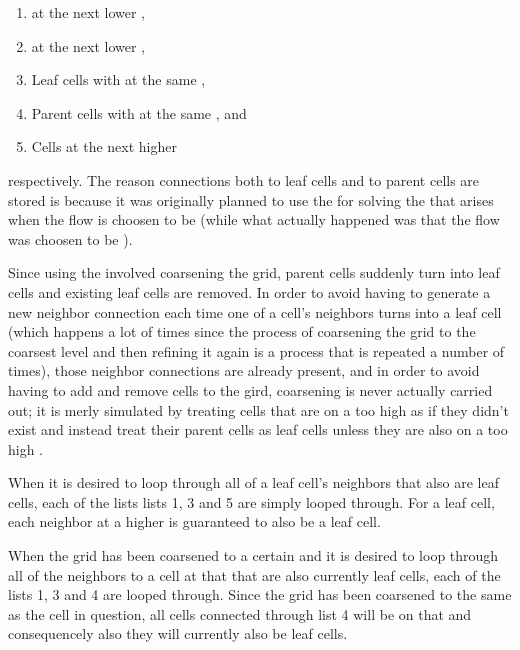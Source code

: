 \begin{enumerate}
    \item {} at the next lower \LOD,
    \item {} at the next lower \LOD,
    \item Leaf cells with at the same \LOD,
    \item Parent cells with at the same \LOD, and
    \item Cells at the next higher \LOD
\end{enumerate}

respectively. The reason connections both to leaf cells and to parent cells are stored is because it was originally planned to use the  for solving the  that arises when the flow is choosen to be  (while what actually happened was that the flow was choosen to be ).

Since using the  involved coarsening the grid, parent cells suddenly turn into leaf cells and existing leaf cells are removed. In order to avoid having to generate a new neighbor connection each time one of a cell's neighbors turns into a leaf cell (which happens a lot of times since the process of coarsening the grid to the coarsest level and then refining it again is a process that is repeated a number of times), those neighbor connections are already present, and in order to avoid having to add and remove cells to the gird, coarsening is never actually carried out; it is merly simulated by treating cells that are on a too high \LOD as if they didn't exist and instead treat their parent cells as leaf cells unless they are also on a too high \LOD.

When it is desired to loop through all of a leaf cell's neighbors that also are leaf cells, each of the lists lists 1, 3 and 5 are simply looped through. For a leaf cell, each neighbor at a higher \LOD is guaranteed to also be a leaf cell.

When the grid has been coarsened to a certain \LOD and it is desired to loop through all of the neighbors to a cell at that \LOD that are also currently leaf cells, each of the lists 1, 3 and 4 are looped through. Since the grid has been coarsened to the same \LOD as the cell in question, all cells connected through list 4 will be on that \LOD and consequencely also they will currently also be leaf cells.

